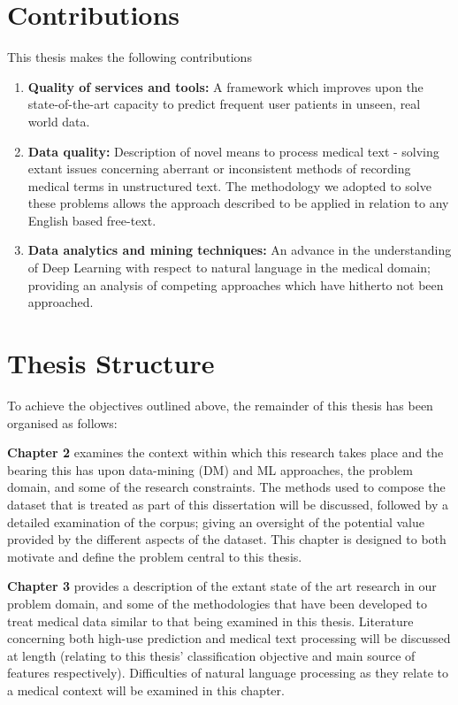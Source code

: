 
\section{Contributions}

This thesis makes the following contributions 

\begin{enumerate}
  \item \textbf{Quality of services and tools:} A framework which improves upon the state-of-the-art capacity to predict frequent user patients in unseen, real world data.
  \item \textbf{Data quality:} Description of novel means to process medical text - solving extant issues concerning aberrant or inconsistent methods of recording medical terms in unstructured text. The methodology we adopted to solve these problems allows the approach described to be applied in relation to any English based free-text.
  \item \textbf{Data analytics and mining techniques:} An advance in the understanding of Deep Learning with respect to natural language in the medical domain; providing an analysis of competing approaches which have hitherto not been approached.
\end{enumerate}



\section{Thesis Structure}



To achieve the objectives outlined above, the remainder of this thesis has been
organised as follows:

\textbf{Chapter 2} examines the context within which this research takes place and the bearing this has upon data-mining (DM) and ML approaches, the problem domain, and some of the research constraints. The methods used to compose the dataset that is treated as part of this dissertation will be discussed, followed by a detailed examination of the corpus; giving an oversight of the potential value provided by the different aspects of the dataset. This chapter is designed to both motivate and define the problem central to this thesis. 


\textbf{Chapter 3} provides a description of the extant state of the art research in our problem domain, and some of the methodologies that have been developed to treat medical data similar to that being examined in this thesis. Literature concerning both high-use prediction and medical text processing will be discussed at length (relating to this thesis' classification objective and main source of features respectively). Difficulties of natural language processing as they relate to a medical context will be examined in this chapter.

